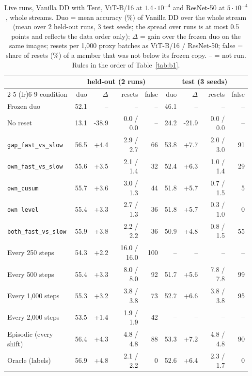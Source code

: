 \documentclass[10pt]{article}
\newcommand{\rl}[1]{\texttt{#1}}
\newcommand{\vit}{ViT-B/16}
\newcommand{\rn}{ResNet-50}
\begin{document}
\begin{table}[t]
  \centering\footnotesize\setlength{\tabcolsep}{4pt}
  \caption{Live runs, Vanilla DD with Tent, \vit{} at $1.4{\cdot}10^{-4}$ and \rn{} at $5{\cdot}10^{-4}$, whole streams. Duo = mean accuracy (\%) of Vanilla DD over the whole stream (mean over 2 held-out runs, 3 test seeds; the spread over runs is at most 0.5 points and reflects the data order only); $\Delta$ = gain over the frozen duo on the same images; resets per 1,000 proxy batches as \vit{} / \rn{}; false = share of resets (\%) of a member that was not below its frozen copy. -- = not run. Rules in the order of Table~\ref{tab:b1}.}
  \label{tab:live}
  \begin{tabular}{@{}l rrrr rrrr@{}}
    \toprule
    & \multicolumn{4}{c}{held-out (2 runs)} & \multicolumn{4}{c}{test (3 seeds)} \\
    \cmidrule(lr){2-5} \cmidrule(lr){6-9}
    condition & duo & $\Delta$ & resets & false & duo & $\Delta$ & resets & false \\
    \midrule
    Frozen duo & 52.1 & -- & -- & -- & 46.1 & -- & -- & -- \\
    \midrule
    No reset & 13.1 & -38.9 & 0.0 / 0.0 & -- & 24.2 & -21.9 & 0.0 / 0.0 & -- \\
    \midrule
    \rl{gap\_fast\_vs\_slow} & 56.5 & +4.4 & 2.9 / 2.7 & 66 & 53.8 & +7.7 & 2.0 / 3.0 & 91 \\
    \rl{own\_fast\_vs\_slow} & 55.6 & +3.5 & 2.1 / 1.4 & 32 & 52.4 & +6.3 & 1.0 / 1.4 & 29 \\
    \rl{own\_cusum} & 55.7 & +3.6 & 3.0 / 1.3 & 44 & 51.8 & +5.7 & 0.7 / 1.5 & 5 \\
    \rl{own\_level} & 55.4 & +3.3 & 2.7 / 1.3 & 36 & 51.8 & +5.7 & 0.3 / 1.0 & 0 \\
    \rl{both\_fast\_vs\_slow} & 55.9 & +3.8 & 2.2 / 2.2 & 36 & 50.9 & +4.8 & 0.8 / 1.5 & 55 \\
    \midrule
    Every 250 steps & 54.3 & +2.2 & 16.0 / 16.0 & 100 & -- & -- & -- & -- \\
    Every 500 steps & 55.4 & +3.3 & 8.0 / 8.0 & 92 & 51.7 & +5.6 & 7.8 / 7.8 & 99 \\
    Every 1,000 steps & 55.3 & +3.2 & 3.8 / 3.8 & 73 & 52.7 & +6.6 & 3.8 / 3.8 & 95 \\
    Every 2,000 steps & 53.5 & +1.4 & 1.9 / 1.9 & 42 & -- & -- & -- & -- \\
    \midrule
    Episodic (every shift) & 56.4 & +4.3 & 4.8 / 4.8 & 88 & 53.3 & +7.2 & 4.8 / 4.8 & 90 \\
    Oracle (labels) & 56.9 & +4.8 & 2.1 / 2.2 & 0 & 52.6 & +6.4 & 2.3 / 1.7 & 0 \\
    \bottomrule
  \end{tabular}
\end{table}
\end{document}
